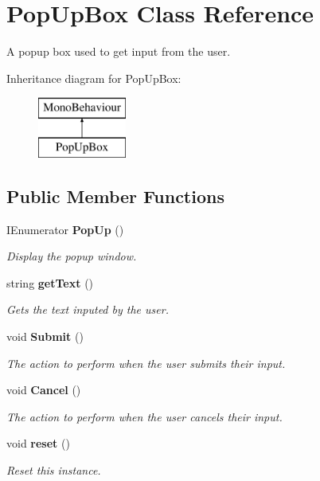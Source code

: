 \section{Pop\+Up\+Box Class Reference}
\label{class_pop_up_box}


A popup box used to get input from the user.  


Inheritance diagram for Pop\+Up\+Box\+:\begin{figure}[H]
\begin{center}
\leavevmode
\includegraphics[height=2.000000cm]{class_pop_up_box}
\end{center}
\end{figure}
\subsection*{Public Member Functions}
\begin{DoxyCompactItemize}
\item 
I\+Enumerator {\bf Pop\+Up} ()
\begin{DoxyCompactList}\small\item\em Display the popup window. \end{DoxyCompactList}\item 
string {\bf get\+Text} ()
\begin{DoxyCompactList}\small\item\em Gets the text inputed by the user. \end{DoxyCompactList}\item 
void {\bf Submit} ()
\begin{DoxyCompactList}\small\item\em The action to perform when the user submits their input. \end{DoxyCompactList}\item 
void {\bf Cancel} ()
\begin{DoxyCompactList}\small\item\em The action to perform when the user cancels their input. \end{DoxyCompactList}\item 
void {\bf reset} ()
\begin{DoxyCompactList}\small\item\em Reset this instance. \end{DoxyCompactList}\end{DoxyCompactItemize}
